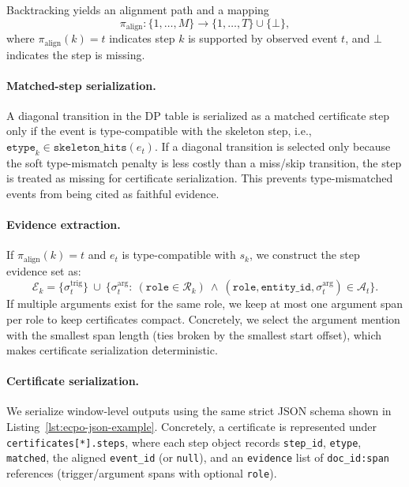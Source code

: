 \documentclass{article}
\begin{document}
Backtracking yields an alignment path and a mapping
\[
\pi_{\mathrm{align}}:\{1,\ldots,M\}\rightarrow \{1,\ldots,T\}\cup\{\bot\},
\]
where $\pi_{\mathrm{align}}(k)=t$ indicates step $k$ is supported by observed event $t$, and $\bot$ indicates the step is missing.

\paragraph{Matched-step serialization.}
A diagonal transition in the DP table is serialized as a matched certificate step only if the event is type-compatible with the skeleton step, i.e.,
$\texttt{etype}_k\in\texttt{skeleton\_hits}(e_t)$.
If a diagonal transition is selected only because the soft type-mismatch penalty is less costly than a miss/skip transition, the step is treated as missing for certificate serialization.
This prevents type-mismatched events from being cited as faithful evidence.

\paragraph{Evidence extraction.}
If $\pi_{\mathrm{align}}(k)=t$ and $e_t$ is type-compatible with $s_k$, we construct the step evidence set as:
\begin{equation}
\mathcal{E}_k=
\{\sigma_{t}^{\mathrm{trig}}\}\ \cup\
\{\sigma_{t}^{\mathrm{arg}}:\ (\texttt{role}\in \mathcal{R}_k)\ \wedge\ (\texttt{role},\texttt{entity\_id},\sigma_{t}^{\mathrm{arg}})\in \mathcal{A}_t\}.
\end{equation}
If multiple arguments exist for the same role, we keep at most one argument span per role to keep certificates compact.
Concretely, we select the argument mention with the smallest span length (ties broken by the smallest start offset), which makes certificate serialization deterministic.

\paragraph{Certificate serialization.}
We serialize window-level outputs using the same strict JSON schema shown in Listing~\ref{lst:ecpo-json-example}.
Concretely, a certificate is represented under \texttt{certificates[*].steps}, where each step object records
\texttt{step\_id}, \texttt{etype}, \texttt{matched}, the aligned \texttt{event\_id} (or \texttt{null}), and an
\texttt{evidence} list of \texttt{doc\_id:span} references (trigger/argument spans with optional \texttt{role}).
\end{document}
